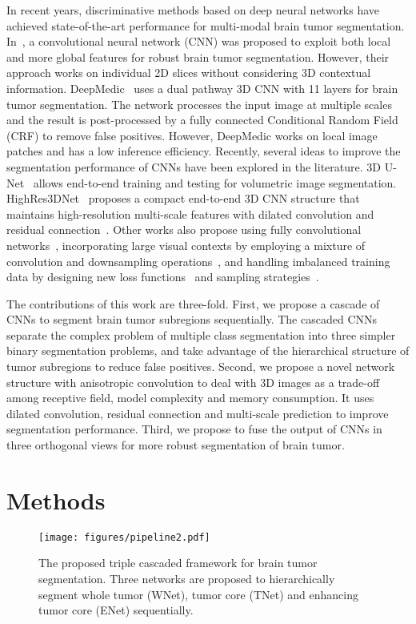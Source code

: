 \documentclass[a4paper,orivec,runningheads]{llncs}
\begin{document}
In recent years, discriminative methods based on deep neural networks have achieved
state-of-the-art performance for multi-modal brain tumor segmentation. In~\cite{Havaei2016}, a convolutional neural network (CNN) was proposed to exploit both local and more global features for robust brain tumor segmentation. However, their approach works on individual 2D slices without considering 3D contextual information.  DeepMedic~\cite{Kamnitsas2017} uses a dual pathway 3D CNN with 11 layers for brain tumor segmentation. The network processes the input image at multiple scales and the result is post-processed by a fully connected Conditional Random Field (CRF) to remove false positives. However, DeepMedic works on local image patches and has a low inference efficiency. Recently, several ideas to improve the segmentation performance of CNNs have been explored
in the literature. 3D U-Net~\cite{Abdulkadir2016} allows end-to-end training and testing for volumetric image segmentation. HighRes3DNet~\cite{Li2017} proposes a compact end-to-end 3D CNN structure that maintains high-resolution multi-scale features with dilated convolution and residual connection~\cite{Wang2017pami,Chen2016a}. Other works also propose using fully convolutional networks~\cite{B2016,Fidon2017a}, incorporating large visual contexts by employing a mixture of convolution and downsampling operations~\cite{Kamnitsas2017,Havaei2016}, and handling imbalanced training data by designing new loss functions~\cite{Fidon2017b,Sudre2017} and sampling strategies~\cite{Sudre2017}.

The contributions of this work are three-fold. First, we propose a cascade of CNNs to segment brain tumor
subregions sequentially. The cascaded CNNs separate the complex problem of multiple class segmentation into  three simpler binary segmentation problems, and take advantage of the hierarchical structure of tumor subregions to reduce false positives. Second, we propose a novel network structure with anisotropic convolution to deal with 3D images as a trade-off among receptive field, model complexity and memory consumption. 
It uses dilated convolution, residual connection and multi-scale prediction to improve segmentation performance. Third, we propose to fuse the output of CNNs in three orthogonal views for more robust segmentation of brain tumor. 
\section{Methods}
\begin{figure}[t]
	\centering
	\texttt{[image: figures/pipeline2.pdf]}
	\caption[The proposed segmentation method]{
		The proposed triple cascaded framework for brain tumor segmentation. Three networks are proposed to hierarchically segment whole tumor (WNet), tumor core (TNet) and enhancing tumor core (ENet) sequentially.
	}
	\label{fig:cascaded_framework}
\end{figure}
\end{document}
